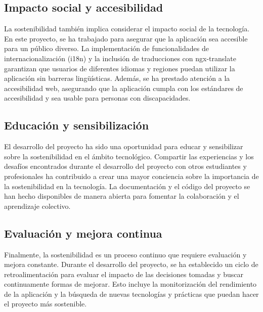 \subsection{Impacto social y accesibilidad}
La sostenibilidad también implica considerar el impacto social de la tecnología. En este proyecto, se ha trabajado para asegurar que la aplicación sea accesible para un público diverso. La implementación de funcionalidades de internacionalización (i18n) y la inclusión de traducciones con ngx-translate garantizan que usuarios de diferentes idiomas y regiones puedan utilizar la aplicación sin barreras lingüísticas. Además, se ha prestado atención a la accesibilidad web, asegurando que la aplicación cumpla con los estándares de accesibilidad y sea usable para personas con discapacidades.

\subsection{Educación y sensibilización}
El desarrollo del proyecto ha sido una oportunidad para educar y sensibilizar sobre la sostenibilidad en el ámbito tecnológico. Compartir las experiencias y los desafíos encontrados durante el desarrollo del proyecto con otros estudiantes y profesionales ha contribuido a crear una mayor conciencia sobre la importancia de la sostenibilidad en la tecnología. La documentación y el código del proyecto se han hecho disponibles de manera abierta para fomentar la colaboración y el aprendizaje colectivo.

\subsection{Evaluación y mejora continua}
Finalmente, la sostenibilidad es un proceso continuo que requiere evaluación y mejora constante. Durante el desarrollo del proyecto, se ha establecido un ciclo de retroalimentación para evaluar el impacto de las decisiones tomadas y buscar continuamente formas de mejorar. Esto incluye la monitorización del rendimiento de la aplicación y la búsqueda de nuevas tecnologías y prácticas que puedan hacer el proyecto más sostenible.

